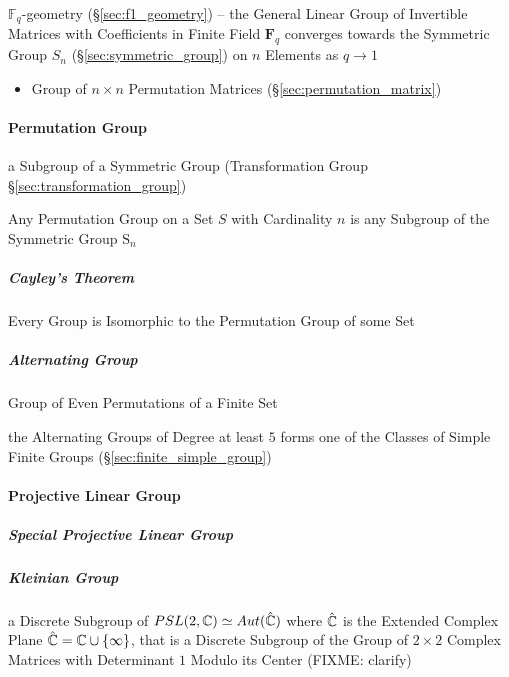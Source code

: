 \fist $\mathbb{F}_q$-geometry (\S\ref{sec:f1_geometry}) -- the General Linear
Group of Invertible Matrices with Coefficients in Finite Field $\mathbf{F}_q$
converges towards the Symmetric Group $S_n$ (\S\ref{sec:symmetric_group}) on $n$
Elements as $q \rightarrow 1$

\begin{itemize}
  \item Group of $n \times n$ Permutation Matrices
    (\S\ref{sec:permutation_matrix})
\end{itemize}



\paragraph{Permutation Group}\label{sec:permutation_group}\hfill

a Subgroup of a Symmetric Group (Transformation Group
\S\ref{sec:transformation_group})

Any Permutation Group on a Set $S$ with Cardinality $n$ is any Subgroup of the
Symmetric Group $\mathrm{S}_n$



\subparagraph{Cayley's Theorem}\label{sec:cayleys_theorem}\hfill

Every Group is Isomorphic to the Permutation Group of some Set



\subparagraph{Alternating Group}\label{sec:alternating_group}\hfill

Group of Even Permutations of a Finite Set

the Alternating Groups of Degree at least $5$ forms one of the Classes of Simple
Finite Groups (\S\ref{sec:finite_simple_group})



\paragraph{Projective Linear Group}\label{sec:projective_linear_group}\hfill

\subparagraph{Special Projective Linear Group}
\label{sec:special_projective_linear_group}\hfill

\subparagraph{Kleinian Group}\label{sec:kleinian_group}\hfill

a Discrete Subgroup of $PSL(2, \mathbb{C}) \simeq Aut(\hat{\mathbb{C}})$ where
$\hat{\mathbb{C}}$ is the Extended Complex Plane
$\hat{\mathbb{C}} = \mathbb{C} \cup \{\infty \}$, that is a Discrete Subgroup of the
Group of $2 \times 2$ Complex Matrices with Determinant $1$ Modulo its Center
(FIXME: clarify)

